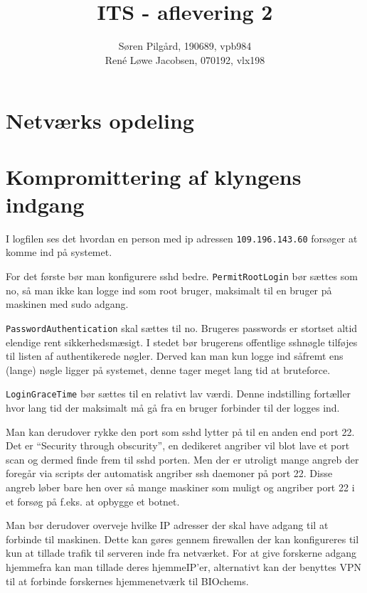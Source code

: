 \documentclass[10pt,a4paper,danish]{article}
\title{ITS - aflevering 2}
\author{Søren Pilgård, 190689, vpb984\\
  René Løwe Jacobsen, 070192, vlx198}
\begin{document}
\maketitle
\newpage

\tableofcontents
\newpage

\section{Netværks opdeling}

\section{Kompromittering af klyngens indgang}

I logfilen ses det hvordan en person med ip adressen \texttt{109.196.143.60}
forsøger at komme ind på systemet.


For det første bør man konfigurere sshd bedre.
\texttt{PermitRootLogin} bør sættes som no, så man ikke kan logge ind som root
bruger, maksimalt til en bruger på maskinen med sudo adgang.

\texttt{PasswordAuthentication} skal sættes til no.
Brugeres passwords er stortset altid elendige rent sikkerhedsmæsigt. I stedet
bør brugerens offentlige sshnøgle tilføjes til listen af authentikerede nøgler.
Derved kan man kun logge ind såfremt ens (lange) nøgle ligger på systemet, denne
tager meget lang tid at bruteforce.

\texttt{LoginGraceTime} bør sættes til en relativt lav værdi. Denne indstilling
fortæller hvor lang tid der maksimalt må gå fra en bruger forbinder til der
logges ind.

Man kan derudover rykke den port som sshd lytter på til en anden end port 22.
Det er ``Security through obscurity'', en dedikeret angriber vil blot lave et
port scan og dermed finde frem til sshd porten. Men der er utroligt mange angreb
der foregår via scripts der automatisk angriber ssh daemoner på port 22.
Disse angreb løber bare hen over så mange maskiner som muligt og angriber port
22 i et forsøg på f.eks. at opbygge et botnet.

Man bør derudover overveje hvilke IP adresser der skal have adgang til at
forbinde til maskinen. Dette kan gøres gennem firewallen der kan konfigureres
til kun at tillade trafik til serveren inde fra netværket.
For at give forskerne adgang hjemmefra kan man tillade deres hjemmeIP'er,
alternativt kan der benyttes VPN til at forbinde forskernes hjemmenetværk til
BIOchems.
\end{document}

